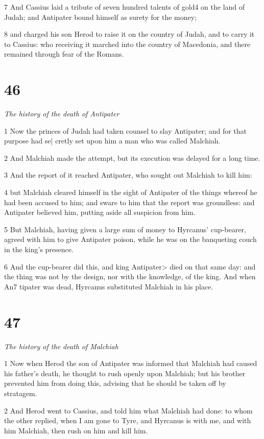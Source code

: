 7 And Cassius laid a tribute of seven hundred talents of gold4 on the land of Judah; and Antipater bound himself as surety for the money; 

8 and charged his son Herod to raise it on the country of Judah, and to carry it to Cassius: who receiving it marched into the country of Macedonia, and there remained through fear of the Romans. 

\chapter{46}

\par \textit{The history of the death of Antipater}

1 Now the princes of Judah had taken counsel to slay Antipater; and for that purpose had se| cretly set upon him a man who was called Malchiah. 

2 And Malchiah made the attempt, but its execution was delayed for a long time. 

3 And the report of it reached Antipater, who sought out Malchiah to kill him: 

4 but Malchiah cleared himself in the sight of Antipater of the things whereof he had been accused to him; and sware to him that the report was groundless: and Antipater believed him, putting aside all suspicion from him. 

5 But Malchiah, having given a large sum of money to Hyrcanus’ cup-bearer, agreed with him to give Antipater poison, while he was on the banqueting couch in the king’s presence. 

6 And the cup-bearer did this, and king Antipater> died on that same day: and the thing was not by the design, nor with the knowledge, of the king. And when An7 tipater was dead, Hyrcanus substituted Malchiah in his place. 

\chapter{47}

\par \textit{The history of the death of Malchiah}

1 Now when Herod the son of Antipater was informed that Malchiah had caused his father’s death, he thought to rush openly upon Malchiah; but his brother prevented him from doing this, advising that he should be taken off by stratagem. 

2 And Herod went to Cassius, and told him what Malchiah had done: to whom the other replied, when I am gone to Tyre, and Hyrcanus is with me, and with him Malchiah, then rush on him and kill him. 

